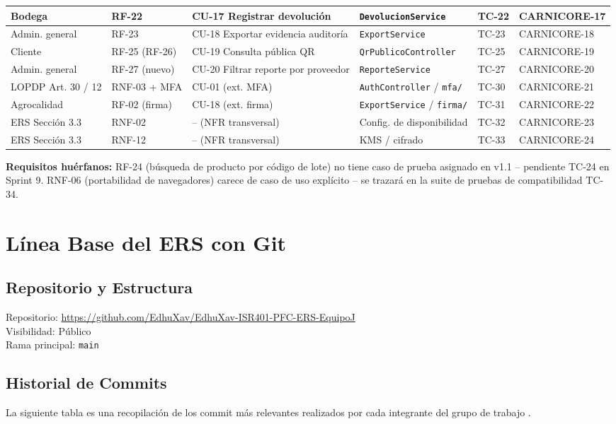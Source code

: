 \documentclass[11pt,a4paper]{article}
\begin{document}
\begin{longtable}{|p{2.1cm}|p{1.1cm}|p{2.6cm}|p{3.7cm}|p{1.3cm}|p{2.4cm}|}
\hline
Bodega & RF-22 & CU-17 Registrar devolución & \texttt{DevolucionService} & TC-22 & CARNICORE-17 \\
\hline
Admin. general & RF-23 & CU-18 Exportar evidencia auditoría & \texttt{ExportService} & TC-23 & CARNICORE-18 \\
\hline
Cliente & RF-25 (RF-26) & CU-19 Consulta pública QR & \texttt{QrPublicoController} & TC-25 & CARNICORE-19 \\
\hline
Admin. general & RF-27 (nuevo) & CU-20 Filtrar reporte por proveedor & \texttt{ReporteService} & TC-27 & CARNICORE-20 \\
\hline
LOPDP Art. 30 / 12 & RNF-03 + MFA & CU-01 (ext. MFA) & \texttt{AuthController} / \texttt{mfa/} & TC-30 & CARNICORE-21 \\
\hline
Agrocalidad & RF-02 (firma) & CU-18 (ext. firma) & \texttt{ExportService} / \texttt{firma/} & TC-31 & CARNICORE-22 \\
\hline
ERS Sección 3.3 & RNF-02 & -- (NFR transversal) & Config. de disponibilidad & TC-32 & CARNICORE-23 \\
\hline
ERS Sección 3.3 & RNF-12 & -- (NFR transversal) & KMS / cifrado & TC-33 & CARNICORE-24 \\
\hline
\end{longtable}

\textbf{Requisitos huérfanos:} RF-24 (búsqueda de producto por código de lote) no tiene caso de
prueba asignado en v1.1 -- pendiente TC-24 en Sprint 9. RNF-06 (portabilidad de navegadores)
carece de caso de uso explícito -- se trazará en la suite de pruebas de compatibilidad TC-34.

\section{Línea Base del ERS con Git}
\subsection{Repositorio y Estructura}
Repositorio: \url{https://github.com/EdhuXav/EdhuXav-ISR401-PFC-ERS-EquipoJ} \\
Visibilidad: Público \\
Rama principal: \texttt{main}

\subsection{Historial de Commits}
La siguiente tabla es una recopilación de los commit más relevantes realizados por cada integrante del grupo de trabajo \cite{wiegers2013}.
\end{document}
